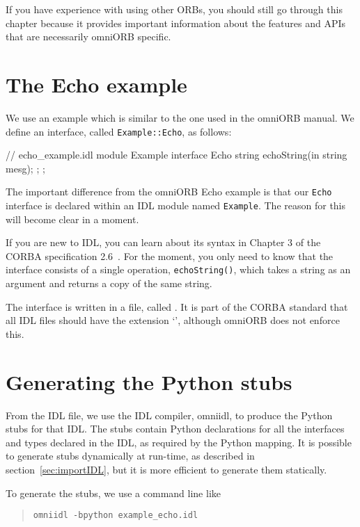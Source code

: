 \documentclass[draft,11pt,twoside,a4paper]{book}
\newcommand{\intf}[1]{\texttt{#1}}
\newcommand{\module}[1]{\texttt{#1}}
\newcommand{\op}[1]{\texttt{#1()}}
\newcommand{\cmdline}[1]{\texttt{#1}}
\newcommand{\file}{\begingroup \urlstyle{tt}\Url}
\begin{document}
If you have experience with using other ORBs, you should still go
through this chapter because it provides important information about
the features and APIs that are necessarily omniORB specific.


\section{The Echo example}

We use an example which is similar to the one used in the omniORB
manual. We define an interface, called \intf{Example::Echo}, as
follows:

\begin{idllisting}
// echo_example.idl
module Example {
  interface Echo {
    string echoString(in string mesg);
  };
};
\end{idllisting}

The important difference from the omniORB Echo example is that our
\intf{Echo} interface is declared within an IDL module named
\module{Example}. The reason for this will become clear in a moment.

If you are new to IDL, you can learn about its syntax in Chapter 3 of
the CORBA specification 2.6~\cite{corba26-spec}. For the moment, you
only need to know that the interface consists of a single operation,
\op{echoString}, which takes a string as an argument and returns a
copy of the same string.

The interface is written in a file, called \file{example_echo.idl}. It
is part of the CORBA standard that all IDL files should have the
extension `\file{.idl}', although omniORB does not enforce this.


\section{Generating the Python stubs}
\label{sec:generatingStubs}

From the IDL file, we use the IDL compiler, omniidl, to produce the
Python stubs for that IDL. The stubs contain Python declarations for
all the interfaces and types declared in the IDL, as required by the
Python mapping. It is possible to generate stubs dynamically at
run-time, as described in section~\ref{sec:importIDL}, but it is more
efficient to generate them statically.

To generate the stubs, we use a command line like

\begin{quote}
\cmdline{omniidl -bpython example\_echo.idl}
\end{quote}
\end{document}
